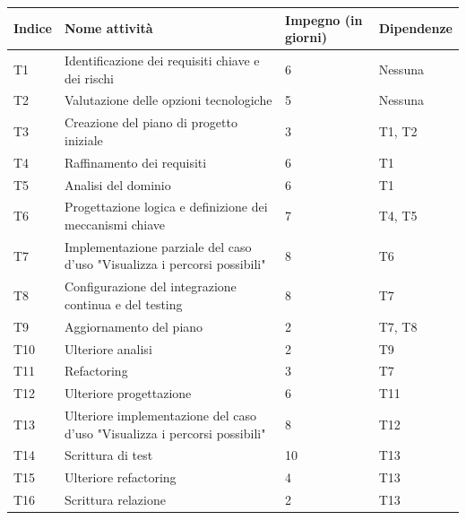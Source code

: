 \begin{table}[htbp]
	\centering
	\begin{tabular}{ | p{2.5cm} | p{6cm} | p{2.5cm} | p{2.5cm} | }
		\hline
			\rowcolor{gray!20}
			Indice & Nome attività & Impegno (in giorni) & Dipendenze \\
		\hline
			T1 & Identificazione dei requisiti chiave e dei rischi & 6 & Nessuna \\
		\hline
			T2 & Valutazione delle opzioni tecnologiche & 5 & Nessuna \\
		\hline
			T3 & Creazione del piano di progetto iniziale & 3 & T1, T2 \\
		\hline
			T4 & Raffinamento dei requisiti & 6 & T1 \\
		\hline
			T5 & Analisi del dominio & 6 & T1 \\
		\hline
			T6 & Progettazione logica e definizione dei meccanismi chiave & 7 & T4, T5 \\
		\hline
			T7 & Implementazione parziale del caso d'uso "Visualizza i percorsi possibili" & 8 & T6 \\
		\hline
			T8 & Configurazione del integrazione continua e del testing & 8 & T7 \\
		\hline
			T9 & Aggiornamento del piano & 2 & T7, T8 \\
		\hline
			T10 & Ulteriore analisi & 2 & T9 \\	
		\hline
			T11 & Refactoring & 3 & T7 \\
		\hline
			T12 & Ulteriore progettazione & 6 & T11 \\
		\hline
			T13 & Ulteriore implementazione del caso d'uso "Visualizza i percorsi possibili" & 8 & T12 \\
		\hline
			T14 & Scrittura di test & 10 & T13 \\
		\hline
			T15 & Ulteriore refactoring & 4 & T13 \\
		\hline
			T16 & Scrittura relazione & 2 & T13 \\
		\hline
	\end{tabular}
\end{table}
